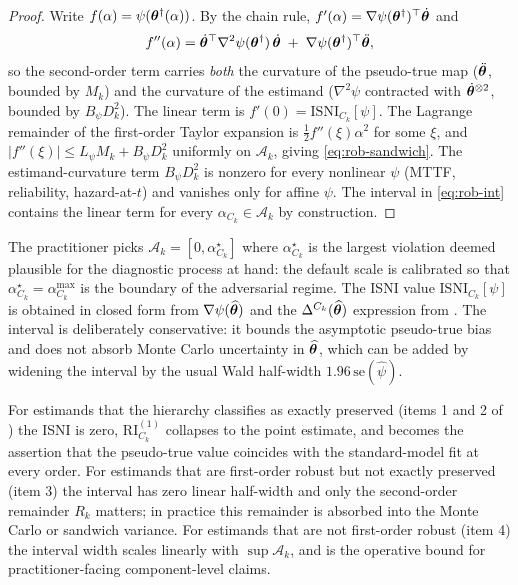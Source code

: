 \begin{proof}
Write $f(\alpha) = \psi(\bm{\theta}^\dagger(\alpha))$. By the chain rule,
$f'(\alpha) = \nabla\psi(\bm{\theta}^\dagger)^\top \dot{\bm{\theta}}$ and
\begin{equation*}
    f''(\alpha) = \dot{\bm{\theta}}^\top \nabla^2\psi(\bm{\theta}^\dagger)\,\dot{\bm{\theta}}
    \;+\; \nabla\psi(\bm{\theta}^\dagger)^\top \ddot{\bm{\theta}},
\end{equation*}
so the second-order term carries \emph{both} the curvature of the
pseudo-true map ($\ddot{\bm{\theta}}$, bounded by $M_k$) and the curvature
of the estimand ($\nabla^2\psi$ contracted with $\dot{\bm{\theta}}^{\otimes
2}$, bounded by $B_\psi D_k^2$). The linear term is
$f'(0) = \mathrm{ISNI}_{C_k}[\psi]$. The Lagrange remainder of the
first-order Taylor expansion is $\tfrac12 f''(\xi)\alpha^2$ for some
$\xi$, and $|f''(\xi)| \leq L_\psi M_k + B_\psi D_k^2$ uniformly on
$\mathcal{A}_k$, giving \eqref{eq:rob-sandwich}. The estimand-curvature
term $B_\psi D_k^2$ is nonzero for every nonlinear $\psi$ (MTTF,
reliability, hazard-at-$t$) and vanishes only for affine $\psi$. The
interval in \eqref{eq:rob-int} contains the linear term for every
$\alpha_{C_k} \in \mathcal{A}_k$ by construction.
\end{proof}

\begin{remark}
\label{rem:robustness-interval-usage}
The practitioner picks $\mathcal{A}_k = [0, \alpha_{C_k}^\star]$ where
$\alpha_{C_k}^\star$ is the largest violation deemed plausible for the
diagnostic process at hand: the default scale is calibrated so that
$\alpha_{C_k}^\star = \alpha_{C_k}^{\max}$ is the boundary of the
adversarial regime. The ISNI value
$\mathrm{ISNI}_{C_k}[\psi]$ is obtained in closed form from
$\nabla \psi(\widehat{\bm{\theta}})$ and the $\Delta^{C_k}(\widehat{\bm{\theta}})$
expression from
. The interval is
deliberately conservative: it bounds the asymptotic pseudo-true bias and
does not absorb Monte Carlo uncertainty in $\widehat{\bm{\theta}}$, which can
be added by widening the interval by the usual Wald half-width
$1.96\, \widehat{\mathrm{se}}(\widehat\psi)$.
\end{remark}

\begin{remark}
\label{rem:rob-int-collapse}
For estimands that the hierarchy classifies as exactly preserved
(items 1 and 2 of ) the ISNI is zero,
$\mathrm{RI}_{C_k}^{(1)}$ collapses to the point estimate, and
 becomes the assertion that the
pseudo-true value coincides with the standard-model fit at every order.
For estimands that are first-order robust but not exactly preserved
(item 3) the interval has zero linear half-width and only the
second-order remainder $R_k$ matters; in practice this remainder is
absorbed into the Monte Carlo or sandwich variance. For estimands that
are not first-order robust (item 4) the interval width scales linearly
with $\sup \mathcal{A}_k$, and is the operative bound for
practitioner-facing component-level claims.
\end{remark}


